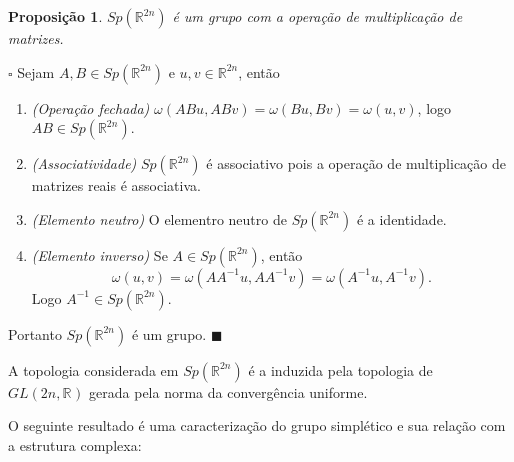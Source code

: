 \documentclass[12pt]{book}
\newtheorem{proposicao}[teorema]{Proposição}
\newenvironment{prova}[1]{$\square$ #1}{\hfill$\blacksquare$}
\newcommand{\generalgroup}[2]{GL(#1, #2)}
\newcommand{\generalgroupreal}[1]{\generalgroup{#1}{\real{}}}
\newcommand{\gruposimpletico}[1]{Sp(#1)}
\newcommand{\real}[1]{\mathbb{R}^{#1}}
\begin{document}
	\begin{proposicao}\label{proposicao_grupo_simpletico_estrutura_grupo}
		$\gruposimpletico{\real{2n}}$ é um grupo com a operação de multiplicação de matrizes.
	\end{proposicao}
	\begin{prova}
		Sejam $A,B \in \gruposimpletico{\real{2n}}$ e $u,v \in \real{2n}$, então
		\begin{enumerate}
			\item \textit{(Operação fechada)} $\omega(ABu, ABv) = \omega(Bu, Bv) = \omega(u,v)$, logo $AB \in \gruposimpletico{\real{2n}}$.
			
			\item \textit{(Associatividade)} $\gruposimpletico{\real{2n}}$ é associativo pois a operação de multiplicação de matrizes reais é associativa.
			
			\item \textit{(Elemento neutro)} O elementro neutro de $\gruposimpletico{\real{2n}}$ é a identidade.
			
			\item \textit{(Elemento inverso)} Se $A \in \gruposimpletico{\real{2n}}$, então $$
			\omega(u, v)=\omega(AA^{-1}u, AA^{-1}v) = \omega(A^{-1}u, A^{-1}v).
			$$
			Logo $A^{-1} \in \gruposimpletico{\real{2n}}$. 
		\end{enumerate}
		Portanto $\gruposimpletico{\real{2n}}$ é um grupo.
	\end{prova}
	
	A topologia considerada em $\gruposimpletico{\real{2n}}$ é a induzida pela topologia de $\generalgroupreal{2n}$ gerada pela norma da convergência uniforme.
	
	O seguinte resultado é uma caracterização do grupo simplético e sua relação com a estrutura complexa:
	
\end{document}
